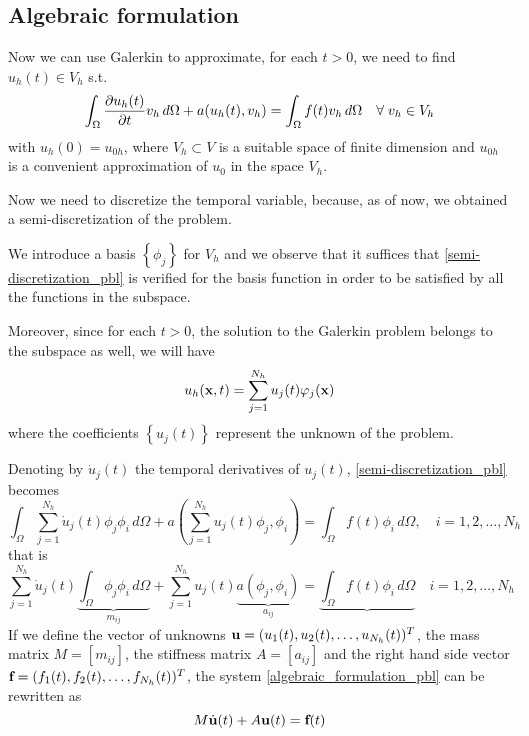 \subsection{Algebraic formulation}
Now we can use Galerkin to approximate, for each \(t > 0\), we need to find \(u_h(t) \in V_h\) s.t. 
\begin{equation}
    \int_\Omega \partialderivative{u_h(t)}{t} v_h \, d\Omega + a(u_h(t), v_h) = \int_\Omega f(t)v_h \, d\Omega \quad \forall \; v_h \in V_h
\label{semi-discretization_pbl}
\end{equation}
with \(u_h(0) = u_{0h}\), where \(V_h \subset V\) is a suitable space of finite dimension and \(u_{0h}\) is a convenient approximation of \(u_0\) in the space \(V_h\).

Now we need to discretize the temporal variable, because, as of now, we obtained a semi-discretization of the problem.

We introduce a basis \(\left\{ \phi_j \right\}\) for \(V_h\) and we observe that it suffices that \eqref{semi-discretization_pbl} is verified for the basis function in order to be satisfied by all the functions in the subspace. 

Moreover, since for each \(t > 0\), the solution to the Galerkin problem belongs to the subspace as well, we will have
\[
    u_h(\textbf{x}, t) = \sum_{j=1}^{N_h} u_j(t)\varphi_j(\textbf{x})
\]
where the coefficients \(\left\{ u_j(t) \right\}\) represent the unknown of the problem. 

Denoting by \(\dot{u}_j(t)\) the temporal derivatives of \(u_j(t)\), \eqref{semi-discretization_pbl} becomes
\[
    \int_\Omega \sum_{j=1}^{N_h} \dot{u}_j(t) \phi_j\phi_i \, d\Omega + a\left( \sum_{j=1}^{N_h} u_j(t)\phi_j, \phi_i \right) = \int_\Omega f(t)\phi_i \, d\Omega, \quad i = 1,2,\ldots, N_h
\]
that is 
\begin{equation}
    \sum_{j=1}^{N_h} \dot{u}_j(t) \underbrace{\int_\Omega \phi_j \phi_i \, d\Omega}_{m_{ij}} + \sum_{j=1}^{N_h} u_j(t) \underbrace{a(\phi_j, \phi_i)}_{a_{ij}} = \underbrace{\int_\Omega f(t)\phi_i \, d\Omega} \quad i = 1,2,\ldots, N_h
    \label{algebraic_formulation_pbl}
\end{equation}
If we define the vector of unknowns \(\textbf{u} = (u_1(t), u_2(t), \ldots, u_{N_h}(t))^T\), the mass matrix \(M = [m_{ij}]\), the stiffness matrix \(A = [a_{ij}]\) and the right hand side vector \(\textbf{f} = (f_1(t), f_2(t), \ldots, f_{N_h}(t))^T\), the system \eqref{algebraic_formulation_pbl} can be rewritten as 
\[
    M\dot{\textbf{u}}(t) + A\textbf{u}(t) = \textbf{f}(t)
\]
